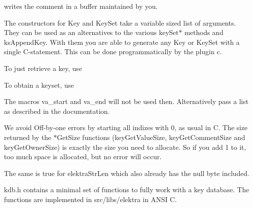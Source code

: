 \begin{DoxyCode}{0}
\end{DoxyCode}


writes the comment in a buffer maintained by you.

The constructors for {\ttfamily Key} and {\ttfamily Key\+Set} take a variable sized list of arguments. They can be used as an alternatives to the various {\ttfamily key\+Set$\ast$} methods and {\ttfamily ks\+Append\+Key}. With them you are able to generate any {\ttfamily Key} or {\ttfamily Key\+Set} with a single C-\/statement. This can be done programmatically by the plugin {\ttfamily c}.

To just retrieve a key, use


\begin{DoxyCode}{0}
\end{DoxyCode}


To obtain a {\ttfamily keyset}, use


\begin{DoxyCode}{0}
\end{DoxyCode}


The macros {\ttfamily va\+\_\+start} and {\ttfamily va\+\_\+end} will not be used then. Alternatively pass a list as described in the documentation.

We avoid Off-\/by-\/one errors by starting all indizes with 0, as usual in C. The size returned by the {\ttfamily $\ast$\+Get\+Size} functions ({\ttfamily key\+Get\+Value\+Size}, {\ttfamily key\+Get\+Comment\+Size} and {\ttfamily key\+Get\+Owner\+Size}) is exactly the size you need to allocate. So if you add 1 to it, too much space is allocated, but no error will occur.

The same is true for {\ttfamily elektra\+Str\+Len} which also already has the null byte included.

{\ttfamily kdb.\+h} contains a minimal set of functions to fully work with a key database. The functions are implemented in {\ttfamily src/libs/elektra} in A\+N\+SI C.

